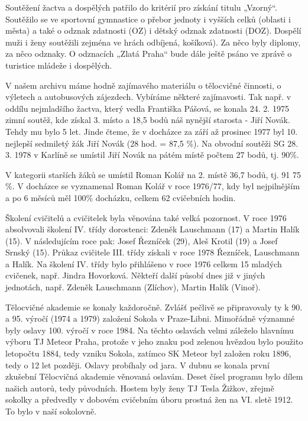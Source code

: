Soutěžení žactva a dospělých patřilo do kritérií pro získání titulu
„Vzorný``. Soutěžilo se ve sportovní gymnastice o přebor jednoty i
vyšších celků (oblasti i města) a také o odznak zdatnosti (OZ) i dětský
odznak zdatnosti (DOZ). Dospělí muži i ženy soutěžili zejména ve hrách
odbíjená, košíková). Za něco byly diplomy, za něco odznaky. O odznacích
„Zlatá Praha`` bude dále ještě psáno ve zprávě o turistice mládeže i
dospělých.

V našem archivu máme hodně zajímavého materiálu o tělocvičné činnosti, o
výletech a autobusových zájezdech. Vybíráme některé zajímavosti. Tak
např. v oddílu nejmladšího žactva, který vedla Františka Pášová, se
konala 24. 2. 1975 zimní soutěž, kde získal 3. místo a 18,5 bodů náš
nynější starosta - Jiří Novák. Tehdy mu bylo 5 let. Jinde čteme, že v
docházce za září až prosinec 1977 byl 10. nejlepší sedmiletý žák Jiří
Novák (28 hod. = 87,5 \%). Na obvodní soutěži SG 28. 3. 1978 v Karlíně
se umístil Jiří Novák na pátém místě počtem 27 bodů, tj. 90\%.

V kategorii starších žáků se umístil Roman Kolář na 2. místě 36,7 bodů,
tj. 91 75 \%. V docházce se vyznamenal Roman Kolář v roce 1976/77, kdy
byl nejpilnějším a po 6 měsíců měl 100\% docházku, celkem 62 cvičebních
hodin.

Školení cvičitelů a cvičitelek byla věnována také velká pozornost. V
roce 1976 absolvovali školení IV. třídy dorostenci: Zdeněk Lauschmann
(17) a Martin Halík (15). V následujícím roce pak: Josef Řezníček (29),
Aleš Krotil (19) a Josef Srnský (15). Průkaz cvičitele III. třídy
získali v roce 1978 Řezníček, Lauschmann a Halík. Na školení IV. třídy
bylo přihlášeno v roce 1976 celkem 15 mladých cvičenek, např. Jindra
Hovorková. Někteří další působí dnes již v jiných jednotách, např.
Zdeněk Lauschmann (Zlíchov), Martin Halík (Vinoř).

Tělocvičné akademie se konaly každoročně. Zvlášť pečlivě se připravovaly
ty k 90. a 95. výročí (1974 a 1979) založení Sokola v Praze-Libni.
Mimořádně významné byly oslavy 100. výročí v roce 1984. Na těchto
oslavách velmi záleželo hlavnímu výboru TJ Meteor Praha, protože v jeho
znaku pod zelenou hvězdou bylo použito letopočtu 1884, tedy vzniku
Sokola, zatímco SK Meteor byl založen roku 1896, tedy o 12 let později.
Oslavy probíhaly od jara. V dubnu se konala první zkušební Tělocvičná
akademie věnovaná oslavám. Deset čísel programu bylo dílem našich
autorů, tedy původních. Hostem byly ženy TJ Tesla Žižkov, zřejmě sokolky
a předvedly v dobovém cvičebním úboru prostná žen na VI. sletě 1912. To
bylo v naší sokolovně.

